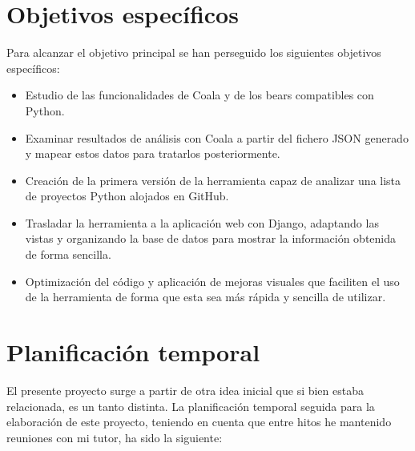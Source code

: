 \documentclass[a4paper, 12pt]{book}
\begin{document}
\section{Objetivos específicos}
\label{sec:objetivos-especificos}
Para alcanzar el objetivo principal se han perseguido los siguientes objetivos específicos:
\begin{itemize}
  \item Estudio de las funcionalidades de Coala y de los bears compatibles con Python.
  \item Examinar resultados de análisis con Coala a partir del fichero JSON generado y mapear estos datos para tratarlos posteriormente.
  \item Creación de la primera versión de la herramienta capaz de analizar una lista de proyectos Python alojados en GitHub.
  \item Trasladar la herramienta a la aplicación web con Django, adaptando las vistas y organizando la base de datos para mostrar la información obtenida de forma sencilla.
  \item Optimización del código y aplicación de mejoras visuales que faciliten el uso de la herramienta de forma que esta sea más rápida y sencilla de utilizar.
\end{itemize}


\section{Planificación temporal}
\label{sec:planificacion-temporal}
El presente proyecto surge a partir de otra idea inicial que si bien estaba relacionada, es un tanto distinta. La planificación temporal seguida para la elaboración de este proyecto, teniendo en cuenta que entre hitos he mantenido reuniones con mi tutor, ha sido la siguiente:
\end{document}
